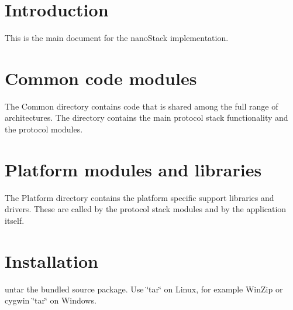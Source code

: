 \hypertarget{index_intro_sec}{}\section{Introduction}\label{index_intro_sec}
This is the main document for the nano\-Stack implementation.\hypertarget{index_common_sec}{}\section{Common code modules}\label{index_common_sec}
The Common directory contains code that is shared among the full range of architectures. The directory contains the main protocol stack functionality and the protocol modules.\hypertarget{index_platform_sec}{}\section{Platform modules and libraries}\label{index_platform_sec}
The Platform directory contains the platform specific support libraries and drivers. These are called by the protocol stack modules and by the application itself.\hypertarget{index_install_sec}{}\section{Installation}\label{index_install_sec}
untar the bundled source package. Use \char`\"{}tar\char`\"{} on Linux, for example Win\-Zip or cygwin \char`\"{}tar\char`\"{} on Windows. 